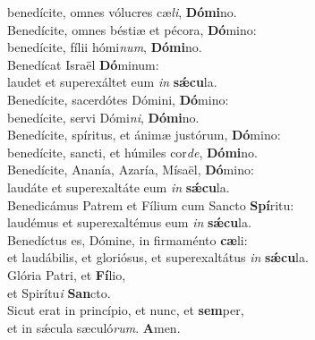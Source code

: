 \oddverse benedícite, omnes vólucres cæ\textit{li}, \textbf{Dó}\textbf{mi}no.\\
\evenverse Benedícite, omnes béstiæ et pécora, \textbf{Dó}mino:~\*\\
\evenverse benedícite, fílii hómi\textit{num}, \textbf{Dó}\textbf{mi}no.\\
\oddverse Benedícat Israël \textbf{Dó}minum:~\*\\
\oddverse laudet et superexáltet eum \textit{in} \textbf{sǽ}\textbf{cu}la.\\
\evenverse Benedícite, sacerdótes Dómini, \textbf{Dó}mino:~\*\\
\evenverse benedícite, servi Dómi\textit{ni}, \textbf{Dó}\textbf{mi}no.\\
\oddverse Benedícite, spíritus, et ánimæ justórum, \textbf{Dó}mino:~\*\\
\oddverse benedícite, sancti, et húmiles cor\textit{de}, \textbf{Dó}\textbf{mi}no.\\
\evenverse Benedícite, Ananía, Azaría, Mísaël, \textbf{Dó}mino:~\*\\
\evenverse laudáte et superexaltáte eum \textit{in} \textbf{sǽ}\textbf{cu}la.\\
\oddverse Benedicámus Patrem et Fílium cum Sancto \textbf{Spí}ritu:~\*\\
\oddverse laudémus et superexaltémus eum \textit{in} \textbf{sǽ}\textbf{cu}la.\\
\evenverse Benedíctus es, Dómine, in firmaménto \textbf{cæ}li:~\*\\
\evenverse et laudábilis, et gloriósus, et superexaltátus \textit{in} \textbf{sǽ}\textbf{cu}la.\\
\oddverse Glória Patri, et \textbf{Fí}lio,~\*\\
\oddverse et Spirítu\textit{i} \textbf{San}cto.\\
\evenverse Sicut erat in princípio, et nunc, et \textbf{sem}per,~\*\\
\evenverse et in sǽcula sæculó\textit{rum}. \textbf{A}men.\\
